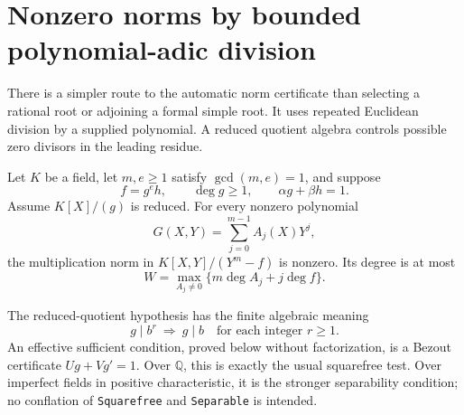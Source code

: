 \section{Nonzero norms by bounded polynomial-adic division}
\label{sec:adic-norm-producer}

There is a simpler route to the automatic norm certificate than selecting
a rational root or adjoining a formal simple root.  It uses repeated
Euclidean division by a supplied polynomial.  A reduced quotient algebra
controls possible zero divisors in the leading residue.

\begin{theorem}
\label{thm:adic-norm}
Let \(K\) be a field, let \(m,e\geq1\) satisfy \(\gcd(m,e)=1\),
and suppose
\[
 f=g^e h,\qquad \deg g\geq1,\qquad
 \alpha g+\beta h=1.
\]
Assume \(K[X]/(g)\) is reduced.  For every nonzero polynomial
\[
 G(X,Y)=\sum_{j=0}^{m-1}A_j(X)Y^j,
\]
the multiplication norm in \(K[X,Y]/(Y^m-f)\) is nonzero.
Its degree is at most
\[
               W=\max_{A_j\ne0}\{m\deg A_j+j\deg f\}.
\]
\end{theorem}

The reduced-quotient hypothesis has the finite algebraic meaning
\[
 g\mid b^r\ \Longrightarrow\ g\mid b
 \quad\text{for each integer }r\geq1.
\]
An effective sufficient condition, proved below without factorization, is
a Bezout certificate \(Ug+Vg'=1\).  Over \(\mathbb Q\), this is
exactly the usual squarefree test.  Over imperfect fields in positive
characteristic, it is the stronger separability condition; no conflation
of \texttt{Squarefree} and \texttt{Separable} is intended.

